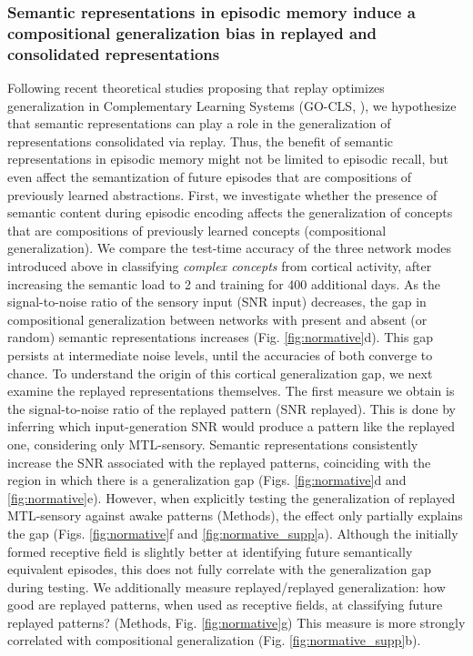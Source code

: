 \documentclass{article}
\begin{document}
\subsubsection*{Semantic representations in episodic memory induce a compositional generalization bias in replayed and consolidated representations}
Following recent theoretical studies proposing that replay optimizes generalization in Complementary Learning Systems (GO-CLS, ), we hypothesize that semantic representations can play a role in the generalization of representations consolidated via replay. Thus, the benefit of semantic representations in episodic memory might not be limited to episodic recall, but even affect the semantization of future episodes that are compositions of previously learned abstractions.
\newline\newline
First, we investigate whether the presence of semantic content during episodic encoding affects the generalization of concepts that are compositions of previously learned concepts (compositional generalization). We compare the test-time accuracy of the three network modes introduced above in classifying \textit{complex concepts} from cortical activity, after increasing the semantic load to 2 and training for 400 additional days. As the signal-to-noise ratio of the sensory input (SNR input) decreases, the gap in compositional generalization between networks with present and absent (or random) semantic representations increases (Fig. \ref{fig:normative}d). This gap persists at intermediate noise levels, until the accuracies of both converge to chance.
\newline\newline
To understand the origin of this cortical generalization gap, we next examine the replayed representations themselves. The first measure we obtain is the signal-to-noise ratio of the replayed pattern (SNR replayed). This is done by inferring which input-generation SNR would produce a pattern like the replayed one, considering only MTL-sensory. Semantic representations consistently increase the SNR associated with the replayed patterns, coinciding with the region in which there is a generalization gap (Figs. \ref{fig:normative}d and \ref{fig:normative}e). However, when explicitly testing the generalization of replayed MTL-sensory against awake patterns (Methods), the effect only partially explains the gap (Figs. \ref{fig:normative}f and \ref{fig:normative_supp}a). Although the initially formed receptive field is slightly better at identifying future semantically equivalent episodes, this does not fully correlate with the generalization gap during testing. We additionally measure replayed/replayed generalization: how good are replayed patterns, when used as receptive fields, at classifying future replayed patterns? (Methods, Fig. \ref{fig:normative}g) This measure is more strongly correlated with compositional generalization (Fig. \ref{fig:normative_supp}b).
\end{document}
